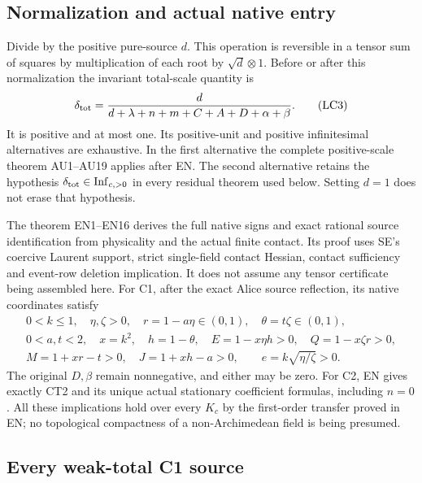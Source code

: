 \subsection{Normalization and actual native entry}

Divide by the positive pure-source \(d\).  This operation is reversible
in a tensor sum of squares by multiplication of each root by
\(\sqrt d\otimes1\).  Before or after this normalization the invariant
total-scale quantity is
\[
 \delta_{\rm tot}
  =\frac d{d+\lambda+n+m+C+A+D+\alpha+\beta}.
\tag{LC3}
\]
It is positive and at most one.  Its positive-unit and positive
infinitesimal alternatives are exhaustive.  In the first alternative
the complete positive-scale theorem AU1--AU19 applies after EN.
The second alternative retains the hypothesis
\(\delta_{\rm tot}\in\mathrm{Inf}_{c,>0}\) in every residual theorem
used below.  Setting \(d=1\) does not erase that hypothesis.

The theorem EN1--EN16 derives the full native signs and exact rational
source identification from physicality and the actual finite contact.
Its proof uses SE's coercive Laurent support, strict single-field
contact Hessian, contact sufficiency and event-row deletion implication.
It does not assume any tensor certificate being assembled here.
For C1, after the exact Alice source reflection, its native coordinates
satisfy
\[
\begin{gathered}
 0<k\leq1,\quad \eta,\zeta>0,\quad
 r=1-a\eta\in(0,1),\quad \theta=t\zeta\in(0,1),\\
 0<a,t<2,\quad x=k^2,\quad h=1-\theta,\quad
 E=1-x\eta h>0,\quad Q=1-x\zeta r>0,\\
 M=1+xr-t>0,\quad J=1+xh-a>0,\qquad
 e=k\sqrt{\eta/\zeta}>0 .
\end{gathered}\tag{LC4}
\]
The original \(D,\beta\) remain nonnegative, and either may be zero.
For C2, EN gives exactly CT2 and its unique actual stationary
coefficient formulas, including \(n=0\).
All these implications hold over every \(K_c\) by the first-order
transfer proved in EN; no topological compactness of a
non-Archimedean field is being presumed.

\subsection{Every weak-total C1 source}

